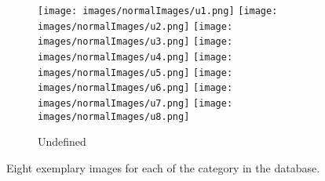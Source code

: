 \documentclass[review,12pt,3p]{elsarticle}
\begin{document}
\begin{figure}
        
        \begin{subfigure}[b]{0.5\textwidth}
                \texttt{[image: images/normalImages/u1.png]}
                \texttt{[image: images/normalImages/u2.png]}
                \texttt{[image: images/normalImages/u3.png]}
                \texttt{[image: images/normalImages/u4.png]}
                \texttt{[image: images/normalImages/u5.png]}
                \texttt{[image: images/normalImages/u6.png]}
                \texttt{[image: images/normalImages/u7.png]}
                \texttt{[image: images/normalImages/u8.png]}
                \caption{Undefined}\label{fig:dataset_6}
        \end{subfigure}%
        \caption{Eight exemplary images for each of the category in the database.}
        \label{fig:dataset}
\end{figure}
\end{document}
